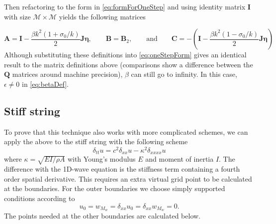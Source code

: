 \documentclass[dvipsnames]{article}
\def\I{\mathbf{I}}
\def\A{\mathbf{A}}
\def\B{\mathbf{B}}
\def\C{\mathbf{C}}
\def\Q{\mathbf{Q}}
\def\U{\mathbf{U}}
\def\J{\mathbf{J}}
\begin{document}
Then refactoring to the form in \eqref{eq:formForOneStep} and using identity matrix $\I$ with size $\mathcal{M} \times \mathcal{M}$ yields the following matrices

\begin{equation}
    \A = \I - \frac{\beta k^2 (1+\sigma_0/k)}{2}\J\boldsymbol{\eta}, \qquad \B = \mathbf{B}_2, \qquad \text{and} \qquad \C = -\left(\I - \frac{\beta k^2 (1-\sigma_0/k)}{2}\J\boldsymbol{\eta}\right)
\end{equation}
Although substituting these definitions into \eqref{eq:oneStepForm} gives an identical result to the matrix definitions above (comparisons show a difference between the $\Q$ matrices around machine precision), $\beta$ can still go to infinity. In this case, $\epsilon \neq 0$ in \eqref{eq:betaDef}. 

\subsection{Stiff string}
To prove that this technique also works with more complicated schemes, we can apply the above to the stiff string with the following scheme
\begin{equation}
    \delta_{tt}u = c^2\delta_{xx}u - \kappa^2\delta_{xxxx}u
\end{equation}
where $\kappa = \sqrt{EI/\rho A}$ with Young's modulus $E$ and moment of inertia $I$. The difference with the 1D-wave equation is the stiffness term containing a fourth order spatial derivative. This requires an extra virtual grid point to be calculated at the boundaries. For the outer boundaries we choose simply supported conditions according to
\begin{equation}
    u_0 = w_{M_w} = \delta_{xx}u_0 =  \delta_{xx}w_{M_w} = 0.
\end{equation}
The points needed at the other boundaries are calculated below. 
\end{document}
